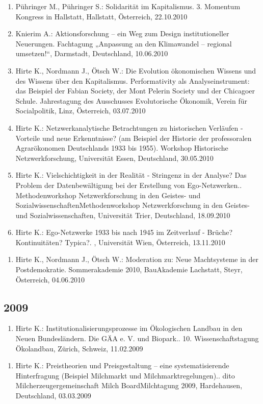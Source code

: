 \begin{enumerate}
	\item Pühringer M., Pühringer S.: Solidarität im Kapitalismus. 3. Momentum Kongress in Hallstatt, Hallstatt, Österreich, 22.10.2010
	\item Knierim A.: Aktionsforschung – ein Weg zum Design institutioneller Neuerungen. Fachtagung „Anpassung an den Klimawandel – regional umsetzen!“, Darmstadt, Deutschland, 10.06.2010
	\item Hirte K., Nordmann J., Ötsch W.: Die Evolution ökonomischen Wissens und des Wissens über den Kapitalismus. Performativity als Analyseinstrument: das Beispiel der Fabian Society, der Mont Pelerin Society und der Chicagoer Schule. Jahrestagung des Ausschusses Evolutorische Ökonomik, Verein für Socialpolitik, Linz, Österreich, 03.07.2010
	\item Hirte K.: Netzwerkanalytische Betrachtungen zu historischen Verläufen - Vorteile und neue Erkenntnisse? (am Beispiel der Historie der professoralen Agrarökonomen Deutschlands 1933 bis 1955). Workshop Historische Netzwerkforschung, Universität Essen, Deutschland, 30.05.2010
	\item Hirte K.: Vielschichtigkeit in der Realität - Stringenz in der Analyse? Das Problem der Datenbewältigung bei der Erstellung von Ego-Netzwerken.. Methodenworkshop Netzwerkforschung in den Geistes- und SozialwissenschaftenMethodenworkshop Netzwerkforschung in den Geistes- und Sozialwissenschaften, Universität Trier, Deutschland, 18.09.2010
	\item Hirte K.: Ego-Netzwerke 1933 bis nach 1945 im Zeitverlauf - Brüche? Kontinuitäten? Typica?. , Universität Wien, Österreich, 13.11.2010
\end{enumerate}

\begin{enumerate}
	\item Hirte K., Nordmann J., Ötsch W.: Moderation zu: Neue Machtsysteme in der Postdemokratie. Sommerakademie 2010, BauAkademie Lachstatt, Steyr, Österreich, 04.06.2010
\end{enumerate}
\subsection*{2009}

\begin{enumerate}
	\item Hirte K.: Institutionalisierungsprozesse im Ökologischen Landbau in den Neuen Bundesländern. Die GÄA e. V. und Biopark.. 10. Wissenschaftstagung Ökolandbau, Zürich, Schweiz, 11.02.2009
\end{enumerate}

\begin{enumerate}
	\item Hirte K.: Preistheorien und Preisgestaltung – eine systematisierende Hinterfragung (Beispiel Milchmarkt und Milchmarktregelungen).. dito Milcherzeugergemeinschaft Milch BoardMilchtagung 2009, Hardehausen, Deutschland, 03.03.2009
\end{enumerate}

